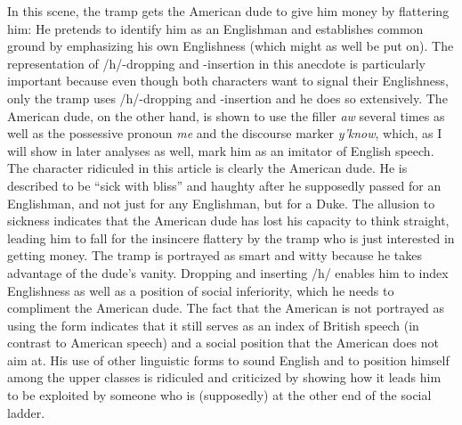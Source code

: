 In this scene, the tramp gets the American dude to give him money by flattering him: He pretends to identify him as an Englishman and establishes common ground by emphasizing his own Englishness (which might as well be put on). The representation of /h/-dropping and -insertion in this anecdote is particularly important because even though both characters want to signal their Englishness, only the tramp uses /h/-dropping and -insertion and he does so extensively. The American dude, on the other hand, is shown to use the filler \emph{aw} several times as well as the possessive pronoun \emph{me} and the discourse marker \emph{y’know}, which, as I will show in later analyses as well, mark him as an imitator of English speech. The character ridiculed in this article is clearly the American dude. He is described to be “sick with bliss” and haughty after he supposedly passed for an Englishman, and not just for any Englishman, but for a Duke. The allusion to sickness indicates that the American dude has lost his capacity to think straight, leading him to fall for the insincere flattery by the tramp who is just interested in getting money. The tramp is portrayed as smart and witty because he takes advantage of the dude’s vanity. Dropping and inserting /h/ enables him to index Englishness as well as a position of social inferiority, which he needs to compliment the American dude. The fact that the American is not portrayed as using the form indicates that it still serves as an index of British speech (in contrast to American speech) and a social position that the American does not aim at. His use of other linguistic forms to sound English and to position himself among the upper classes is ridiculed and criticized by showing how it leads him to be exploited by someone who is (supposedly) at the other end of the social ladder.



